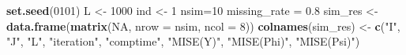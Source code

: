 \documentclass[
]{article}
\newenvironment{Shaded}{\begin{snugshade}}{\end{snugshade}}
\newcommand{\AttributeTok}[1]{\textcolor[rgb]{0.13,0.29,0.53}{#1}}
\newcommand{\ConstantTok}[1]{\textcolor[rgb]{0.56,0.35,0.01}{#1}}
\newcommand{\DecValTok}[1]{\textcolor[rgb]{0.00,0.00,0.81}{#1}}
\newcommand{\FloatTok}[1]{\textcolor[rgb]{0.00,0.00,0.81}{#1}}
\newcommand{\FunctionTok}[1]{\textcolor[rgb]{0.13,0.29,0.53}{\textbf{#1}}}
\newcommand{\NormalTok}[1]{#1}
\newcommand{\OtherTok}[1]{\textcolor[rgb]{0.56,0.35,0.01}{#1}}
\newcommand{\StringTok}[1]{\textcolor[rgb]{0.31,0.60,0.02}{#1}}
\begin{document}
\begin{Shaded}
\begin{Highlighting}[]
\FunctionTok{set.seed}\NormalTok{(}\DecValTok{0101}\NormalTok{)}
\NormalTok{L }\OtherTok{\textless{}{-}} \DecValTok{1000}
\NormalTok{ind }\OtherTok{\textless{}{-}} \DecValTok{1}
\NormalTok{nsim}\OtherTok{=}\DecValTok{10}
\NormalTok{missing\_rate }\OtherTok{=} \FloatTok{0.8}
\NormalTok{sim\_res }\OtherTok{\textless{}{-}} \FunctionTok{data.frame}\NormalTok{(}\FunctionTok{matrix}\NormalTok{(}\ConstantTok{NA}\NormalTok{, }\AttributeTok{nrow =}\NormalTok{ nsim, }\AttributeTok{ncol =} \DecValTok{8}\NormalTok{))}
\FunctionTok{colnames}\NormalTok{(sim\_res) }\OtherTok{\textless{}{-}} \FunctionTok{c}\NormalTok{(}\StringTok{"I"}\NormalTok{, }\StringTok{"J"}\NormalTok{, }\StringTok{"L"}\NormalTok{, }\StringTok{"iteration"}\NormalTok{, }
                       \StringTok{"comptime"}\NormalTok{, }\StringTok{"MISE(Y)"}\NormalTok{, }\StringTok{"MISE(Phi)"}\NormalTok{, }\StringTok{"MISE(Psi)"}\NormalTok{)}


\end{Highlighting}
\end{Shaded}
\end{document}
